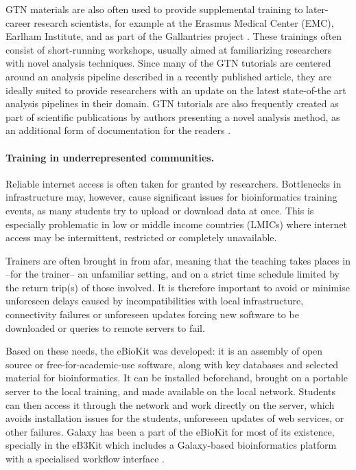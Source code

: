 GTN materials are also often used to provide supplemental training to later-career research scientists, for example at the Erasmus Medical Center (EMC), Earlham Institute, and as part of the Gallantries project \cite{gallantries}. These trainings often consist of short-running workshops, usually aimed at familiarizing researchers with novel analysis techniques. Since many of the GTN tutorials are centered around an analysis pipeline described in a recently published article, they are ideally suited to provide researchers with an update on the latest state-of-the art analysis pipelines in their domain. 
GTN tutorials are also frequently created as part of scientific publications by authors presenting a novel analysis method, as an additional form of documentation for the readers \cite{Mehta2021, deKoning2020, Tekman2020, Circos, fahrner2022democratizing, bray2022galaxy}.

\paragraph{Training in underrepresented communities.}
Reliable internet access is often taken for granted by researchers. Bottlenecks in infrastructure may, however, cause significant issues for bioinformatics training events, as many students try to upload or download data at once. This is especially problematic in low or middle income countries (LMICs) where internet access may be intermittent, restricted or completely unavailable.

Trainers are often brought in from afar, meaning that the teaching takes places in --for the trainer-- an unfamiliar setting, and on a strict time schedule limited by the return trip(s) of those involved. It is therefore important to avoid or minimise unforeseen delays caused by incompatibilities with local infrastructure, connectivity failures or unforeseen updates forcing new software to be downloaded or queries to remote servers to fail.

Based on these needs, the eBioKit \cite{Hernandez2017} was developed: it is an assembly of open source or free-for-academic-use software, along with key databases and selected material for bioinformatics. It can be installed beforehand, brought on a portable server to the local training, and made available on the local network. Students can then access it through the network and work directly on the server, which avoids installation issues for the students, unforeseen updates of web services, or other failures. Galaxy has been a part of the eBioKit for most of its existence, specially in the eB3Kit which includes a Galaxy-based bioinformatics platform with a specialised workflow interface \cite{Klingstrom_2017}. %

